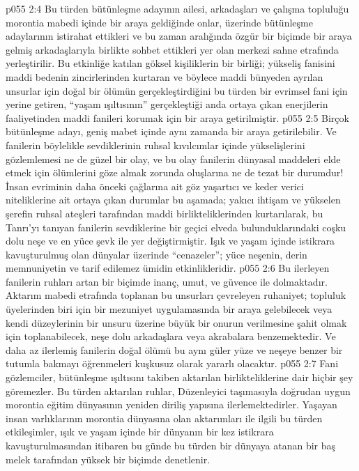 \vs p055 2:4 Bu türden bütünleşme adayının ailesi, arkadaşları ve çalışma topluluğu morontia mabedi içinde bir araya geldiğinde onlar, üzerinde bütünleşme adaylarının istirahat ettikleri ve bu zaman aralığında özgür bir biçimde bir araya gelmiş arkadaşlarıyla birlikte sohbet ettikleri yer olan merkezi sahne etrafında yerleştirilir. Bu etkinliğe katılan göksel kişiliklerin bir birliği; yükseliş fanisini maddi bedenin zincirlerinden kurtaran ve böylece maddi bünyeden ayrılan unsurlar için doğal bir ölümün gerçekleştirdiğini bu türden bir evrimsel fani için yerine getiren, “yaşam ışıltısının” gerçekleştiği anda ortaya çıkan enerjilerin faaliyetinden maddi fanileri korumak için bir araya getirilmiştir.
\vs p055 2:5 Birçok bütünleşme adayı, geniş mabet içinde aynı zamanda bir araya getirilebilir. Ve fanilerin böylelikle sevdiklerinin ruhsal kıvılcımlar içinde yükselişlerini gözlemlemesi ne de güzel bir olay, ve bu olay fanilerin dünyasal maddeleri elde etmek için ölümlerini göze almak zorunda oluşlarına ne de tezat bir durumdur! İnsan evriminin daha önceki çağlarına ait göz yaşartıcı ve keder verici niteliklerine ait ortaya çıkan durumlar bu aşamada; yakıcı ihtişam ve yükselen şerefin ruhsal ateşleri tarafından maddi birlikteliklerinden kurtarılarak, bu Tanrı’yı tanıyan fanilerin sevdiklerine bir geçici elveda bulunduklarındaki coşku dolu neşe ve en yüce şevk ile yer değiştirmiştir. Işık ve yaşam içinde istikrara kavuşturulmuş olan dünyalar üzerinde “cenazeler”; yüce neşenin, derin memnuniyetin ve tarif edilemez ümidin etkinlikleridir.
\vs p055 2:6 Bu ilerleyen fanilerin ruhları artan bir biçimde inanç, umut, ve güvence ile dolmaktadır. Aktarım mabedi etrafında toplanan bu unsurları çevreleyen ruhaniyet; topluluk üyelerinden biri için bir mezuniyet uygulamasında bir araya gelebilecek veya kendi düzeylerinin bir unsuru üzerine büyük bir onurun verilmesine şahit olmak için toplanabilecek, neşe dolu arkadaşlara veya akrabalara benzemektedir. Ve daha az ilerlemiş fanilerin doğal ölümü bu aynı güler yüze ve neşeye benzer bir tutumla bakmayı öğrenmeleri kuşkusuz olarak yararlı olacaktır.
\vs p055 2:7 Fani gözlemciler, bütünleşme ışıltısını takiben aktarılan birlikteliklerine dair hiçbir şey göremezler. Bu türden aktarılan ruhlar, Düzenleyici taşımasıyla doğrudan uygun morontia eğitim dünyasının yeniden diriliş yapısına ilerlemektedirler. Yaşayan insan varlıklarının morontia dünyasına olan aktarımları ile ilgili bu türden etkileşimler, ışık ve yaşam içinde bir dünyanın bir kez istikrara kavuşturulmasından itibaren bu günde bu türden bir dünyaya atanan bir baş melek tarafından yüksek bir biçimde denetlenir.
